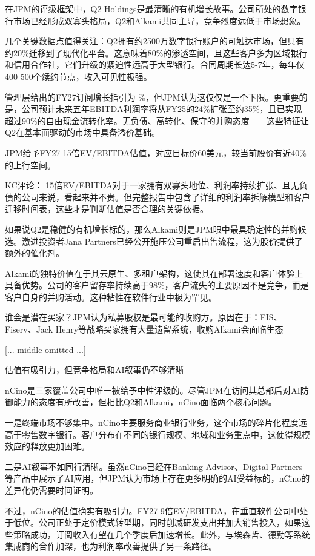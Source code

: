 \documentclass[11pt]{ctexart}
\begin{document}
在JPM的评级框架中，Q2 Holdings是最清晰的有机增长故事。公司所处的数字银行市场已经形成双寡头格局，Q2和Alkami共同主导，竞争烈度远低于市场想象。

几个关键数据点值得关注：Q2拥有约2500万数字银行账户的可触达市场，但只有约20\%迁移到了现代化平台。这意味着80\%的渗透空间，且这些客户多为区域银行和信用合作社，它们升级的紧迫性远高于大型银行。合同周期长达5-7年，每年仅400-500个续约节点，收入可见性极强。

管理层给出的FY27订阅增长指引为 \%，但JPM认为这仅仅是一个下限。更重要的是，公司预计未来五年EBITDA利润率将从FY25的24\%扩张至约35\%，且已实现超过90\%的自由现金流转化率。无负债、高转化、保守的并购态度——这些特征让Q2在基本面驱动的市场中具备溢价基础。

JPM给予FY27 15倍EV/EBITDA估值，对应目标价60美元，较当前股价有近40\%的上行空间。

KC评论： 15倍EV/EBITDA对于一家拥有双寡头地位、利润率持续扩张、且无负债的公司来说，看起来并不贵。但完整报告中包含了详细的利润率拆解模型和客户迁移时间表，这些才是判断估值是否合理的关键依据。

如果说Q2是稳健的有机增长标的，那么Alkami则是JPM眼中最具确定性的并购候选。激进投资者Jana Partners已经公开施压公司重启出售流程，这为股价提供了额外的催化剂。

Alkami的独特价值在于其云原生、多租户架构，这使其在部署速度和客户体验上具备优势。公司的客户留存率持续高于98\%，客户流失的主要原因不是竞争，而是客户自身的并购活动。这种粘性在软件行业中极为罕见。

谁会是潜在买家？JPM认为私募股权是最可能的收购方。原因在于：FIS、Fiserv、Jack Henry等战略买家拥有大量遗留系统，收购Alkami会面临生态

[... middle omitted ...]

估值有吸引力，但竞争格局和AI叙事仍不够清晰

nCino是三家覆盖公司中唯一被给予中性评级的。尽管JPM在访问其总部后对AI防御能力的态度有所改善，但相比Q2和Alkami，nCino面临两个核心问题。

一是终端市场不够集中。nCino主要服务商业银行业务，这个市场的碎片化程度远高于零售数字银行。客户分布在不同的银行规模、地域和业务重点中，这使得规模效应的释放更加困难。

二是AI叙事不如同行清晰。虽然nCino已经在Banking Advisor、Digital Partners等产品中展示了AI应用，但JPM认为市场上存在更多明确的AI受益标的，nCino的差异化仍需要时间证明。

不过，nCino的估值确实有吸引力。FY27 9倍EV/EBITDA，在垂直软件公司中处于低位。公司正处于定价模式转型期，同时削减研发支出并加大销售投入，如果这些策略成功，订阅收入有望在几个季度后加速增长。此外，与埃森哲、德勤等系统集成商的合作加深，也为利润率改善提供了另一条路径。
\end{document}

